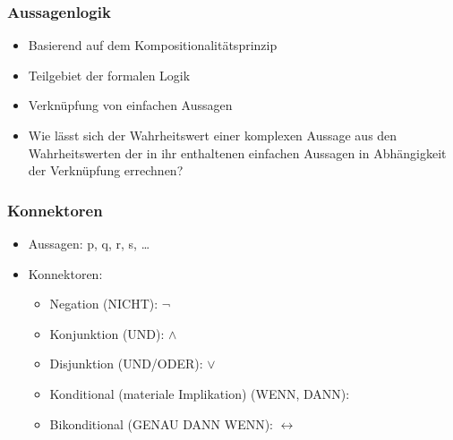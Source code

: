 \begin{frame}
\frametitle{Aussagenlogik}

\begin{itemize}
	\item Basierend auf dem Kompositionalitätsprinzip
	\item Teilgebiet der formalen Logik
	\item Verknüpfung von einfachen Aussagen
	\item Wie lässt sich der Wahrheitswert einer komplexen Aussage aus den Wahrheitswerten der in ihr enthaltenen einfachen Aussagen in Abhängigkeit der Verknüpfung errechnen?
\end{itemize}

\end{frame}




\begin{frame}
\frametitle{Konnektoren}

\begin{itemize}
	\item Aussagen: p, q, r, s, \dots
	\item Konnektoren:
	
	\begin{itemize}
		\item Negation (NICHT): $\lnot$
		
		\item Konjunktion (UND): $\land$
		
		\item Disjunktion (UND/ODER): $\lor$
		
		\item Konditional (materiale Implikation) (WENN, DANN): \ras
		
		\item Bikonditional (GENAU DANN WENN): $\leftrightarrow$
	\end{itemize}
	
\end{itemize}

\end{frame}



